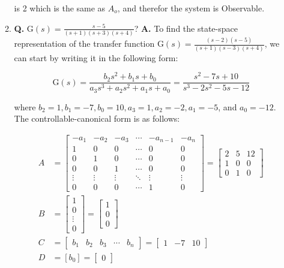 \documentclass[main.tex]{subfiles}
\begin{document}
\begin{enumerate}
\begin{enumerate}
    is 2 which is the same as $A_o$, and therefor the system is Observable.
    
    \item \textbf{Q.} $\mathrm{G}(s)=\frac{s-5}{(s+1)(s+3)(s+4)}$? \textbf{A.} To find the state-space representation of the transfer function $\mathrm{G}(s)=\frac{(s-2)(s-5)}{(s+1)(s-3)(s+4)}$, we can start by writing it in the following form:
    
    $$
    \mathrm{G}(s)=\frac{b_2 s^2+b_1 s+b_0}{a_3 s^3+a_2 s^2+a_1 s+a_0}=\frac{s^2-7s+10}{s^3-2s^2-5s-12}
    $$
    
    where $b_2=1, b_1=-7, b_0=10, a_3=1, a_2=-2, a_1=-5$, and $a_0=-12$. The controllable-canonical form is as follows:
    
    $$
    \begin{aligned}
    A &= \left[\begin{array}{cccccc}
    -a_1 & -a_2 & -a_3 & \cdots & -a_{n-1} & -a_n \\
    1 & 0 & 0 & \cdots & 0 & 0 \\
    0 & 1 & 0 & \cdots & 0 & 0 \\
    0 & 0 & 1 & \cdots & 0 & 0 \\
    \vdots & \vdots & \vdots & \ddots & \vdots & \vdots \\
    0 & 0 & 0 & \cdots & 1 & 0
    \end{array}\right] = \left[\begin{array}{ccc}
    2 & 5 & 12 \\
    1 & 0 & 0 \\
    0 & 1 & 0
    \end{array}\right] \\
    B &= \left[\begin{array}{c}
    1 \\
    0 \\
    \vdots \\
    0
    \end{array}\right] = \left[\begin{array}{l}
    1 \\
    0 \\
    0
    \end{array}\right] \\
    C &= \left[\begin{array}{lllll}
    b_1 & b_2 & b_3 & \cdots & b_n
    \end{array}\right] = \left[\begin{array}{lll}
    1 & -7 & 10
    \end{array}\right] \\
    D &= \left[b_0\right] = \left[\begin{array}{ll}
    0
    \end{array}\right]\\
    \end{aligned}
    $$
    

\end{enumerate}
\end{enumerate}
\end{document}
